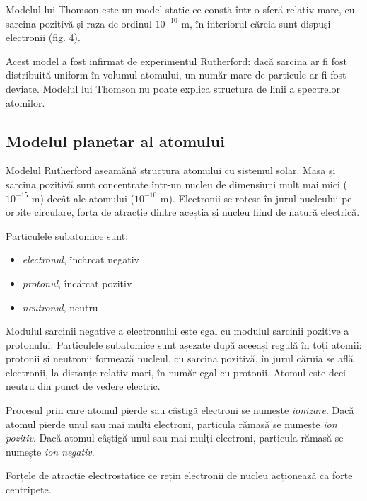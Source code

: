 Modelul lui Thomson este un model static ce constă într-o sferă relativ mare,
cu sarcina pozitivă și raza de ordinul $10^{-10}$ m, în interiorul căreia sunt
dispuși electronii (fig. 4).

Acest model a fost infirmat de experimentul
Rutherford: dacă sarcina ar fi fost distribuită uniform în volumul atomului, un
număr mare de particule {\alpha} ar fi fost deviate. Modelul lui Thomson nu
poate explica structura de linii a spectrelor atomilor.

\clearpage

\subsection{Modelul planetar al atomului}

Modelul Rutherford aseamănă structura atomului cu sistemul solar. Masa și
sarcina pozitivă sunt concentrate într-un nucleu de dimensiuni mult mai mici
($10^{-15}$ m) decât ale atomului ($10^{-10}$ m). Electronii se rotesc în jurul
nucleului pe orbite circulare, forța de atracție dintre aceștia și nucleu fiind
de natură electrică.

Particulele subatomice sunt:
\begin{itemize}
    \item \emph{electronul}, încărcat negativ
    \item \emph{protonul}, încărcat pozitiv
    \item \emph{neutronul}, neutru
\end{itemize}

Modulul sarcinii negative a electronului este egal cu modulul sarcinii pozitive
a protonului. Particulele subatomice sunt așezate după aceeași regulă în toți
atomii: protonii și neutronii formează nucleul, cu sarcina pozitivă, în jurul
căruia se află electronii, la distanțe relativ mari, în număr egal cu protonii.
Atomul este deci neutru din punct de vedere electric.

Procesul prin care atomul pierde sau câștigă electroni se numește
\emph{ionizare}. Dacă atomul pierde unul sau mai mulți electroni, particula
rămasă se numește \emph{ion pozitiv}. Dacă atomul câștigă unul sau mai mulți
electroni, particula rămasă se numește \emph{ion negativ}.

Forțele de atracție electrostatice ce rețin electronii de nucleu acționează ca
forțe centripete.
